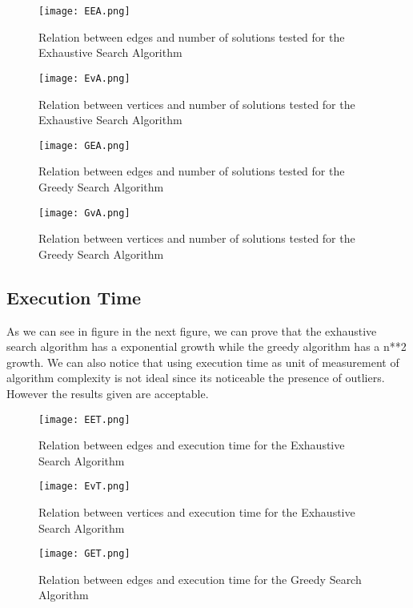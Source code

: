 \documentclass[...]{revdetua}
\begin{document}
\begin{figure}[H]
\centering
\texttt{[image: EEA.png]}
\label{fig:EEA}
\caption{Relation between edges and number of solutions tested for the Exhaustive Search Algorithm}
\end{figure}

\begin{figure}[H]
\centering
\texttt{[image: EvA.png]}
\label{fig:EvA}
\caption{Relation between vertices and number of solutions tested for the Exhaustive Search Algorithm}
\end{figure}

\begin{figure}[H]
\centering
\texttt{[image: GEA.png]}
\label{fig:GEA}
\caption{Relation between edges and number of solutions tested for the Greedy Search Algorithm}
\end{figure}

\begin{figure}[H]
\centering
\texttt{[image: GvA.png]}
\label{fig:GvA}
\caption{Relation between vertices and number of solutions tested for the Greedy Search Algorithm}
\end{figure}


\subsection{Execution Time}

As we can see in figure in the next figure, we can prove that the exhaustive search algorithm has a exponential growth while the greedy algorithm has a n**2 growth. We can also notice that using execution time as unit of measurement of algorithm complexity is not ideal since its noticeable the presence of outliers. However the results given are acceptable.


\begin{figure}[H]
\centering
\texttt{[image: EET.png]}
\label{fig:EEA}
\caption{Relation between edges and execution time for the Exhaustive Search Algorithm}
\end{figure}

\begin{figure}[H]
\centering
\texttt{[image: EvT.png]}
\label{fig:EvA}
\caption{Relation between vertices and execution time for the Exhaustive Search Algorithm}
\end{figure}

\begin{figure}[H]
\centering
\texttt{[image: GET.png]}
\label{fig:GEA}
\caption{Relation between edges and execution time for the Greedy Search Algorithm}
\end{figure}
\end{document}
